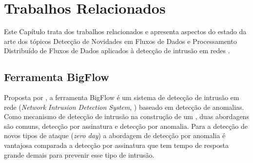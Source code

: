 \chapter{Trabalhos Relacionados}\label{cha:related}



Este Capítulo trata dos trabalhos relacionados e apresenta aspectos do estado da
arte dos tópicos Detecção de Novidades em Fluxos de Dados e Processamento
Distribuído de Fluxos de Dados aplicados à detecção de intrusão em redes \iot.

\newcommand{\kafka}{\emph{Apache Kafka}\xspace}
\newcommand{\spark}{\emph{Apache Spark}\xspace}
\newcommand{\python}{\emph{Python}\xspace}

% 
% 
% 

\section{Ferramenta BigFlow}

Proposta por , a ferramenta BigFlow é um sistema de
detecção de intrusão em rede (\emph{Network Intrusion Detection System}, \nids)
baseado em detecção de anomalias.
Como mecanismo de detecção de intrusão na construção de um \nids, duas
abordagens são comuns, detecção por assinatura e detecção por anomalia.
Para a detecção de novos tipos de ataque (\emph{zero day}) a abordagem de
detecção por anomalia é vantajosa comparada a detecção por assinatura que tem
tempo de resposta grande demais para prevenir esse tipo de intrusão.

